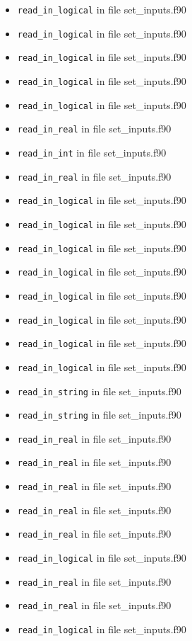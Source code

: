 \begin{itemize}
\begin{itemize}
    \item {\tt read\_in\_logical} in file set\_inputs.f90
    \item {\tt read\_in\_logical} in file set\_inputs.f90
    \item {\tt read\_in\_logical} in file set\_inputs.f90
    \item {\tt read\_in\_logical} in file set\_inputs.f90
    \item {\tt read\_in\_logical} in file set\_inputs.f90
    \item {\tt read\_in\_real} in file set\_inputs.f90
    \item {\tt read\_in\_int} in file set\_inputs.f90
    \item {\tt read\_in\_real} in file set\_inputs.f90
    \item {\tt read\_in\_logical} in file set\_inputs.f90
    \item {\tt read\_in\_logical} in file set\_inputs.f90
    \item {\tt read\_in\_logical} in file set\_inputs.f90
    \item {\tt read\_in\_logical} in file set\_inputs.f90
    \item {\tt read\_in\_logical} in file set\_inputs.f90
    \item {\tt read\_in\_logical} in file set\_inputs.f90
    \item {\tt read\_in\_logical} in file set\_inputs.f90
    \item {\tt read\_in\_logical} in file set\_inputs.f90
    \item {\tt read\_in\_string} in file set\_inputs.f90
    \item {\tt read\_in\_string} in file set\_inputs.f90
    \item {\tt read\_in\_real} in file set\_inputs.f90
    \item {\tt read\_in\_real} in file set\_inputs.f90
    \item {\tt read\_in\_real} in file set\_inputs.f90
    \item {\tt read\_in\_real} in file set\_inputs.f90
    \item {\tt read\_in\_real} in file set\_inputs.f90
    \item {\tt read\_in\_logical} in file set\_inputs.f90
    \item {\tt read\_in\_real} in file set\_inputs.f90
    \item {\tt read\_in\_real} in file set\_inputs.f90
    \item {\tt read\_in\_logical} in file set\_inputs.f90

\end{itemize}
\end{itemize}
